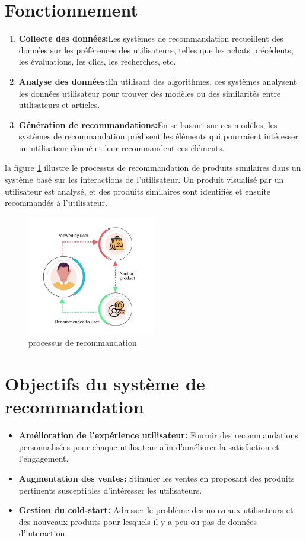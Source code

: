 \documentclass[edit,12pt,a4paper,ChapStyle,oneside,doubleinterligne]{report}
\begin{document}
\section{Fonctionnement}
\begin{enumerate}
    \item \textbf{Collecte des données:}Les systèmes de recommandation recueillent des données sur les préférences des utilisateurs, telles que les achats précédents, les évaluations, les clics, les recherches, etc.
    \item \textbf{Analyse des données:}En utilisant des algorithmes, ces systèmes analysent les données utilisateur pour trouver des modèles ou des similarités entre utilisateurs et articles.
    \item \textbf{Génération de recommandations:}En se basant sur ces modèles, les systèmes de recommandation prédisent les éléments qui pourraient intéresser un utilisateur donné et leur recommandent ces éléments.
\end{enumerate}
la figure \ref{sr} illustre le processus de recommandation de produits similaires dans un système basé sur les interactions de l'utilisateur. Un produit visualisé par un utilisateur est analysé, et des produits similaires sont identifiés et ensuite recommandés à l'utilisateur.
\begin{figure}[H]
    \centering
    \includegraphics[width=0.5\textwidth]{images/recommendation system.jpg}
    \caption{processus de recommandation}\label{sr}
\end{figure}
\section{Objectifs du système de recommandation}
\begin{itemize}
    \item \textbf{Amélioration de l'expérience utilisateur:} Fournir des recommandations personnalisées pour chaque utilisateur afin d'améliorer la satisfaction et l'engagement.
    \item \textbf{Augmentation des ventes:} Stimuler les ventes en proposant des produits pertinents susceptibles d'intéresser les utilisateurs.
    \item \textbf{Gestion du cold-start:} Adresser le problème des nouveaux utilisateurs et des nouveaux produits pour lesquels il y a peu ou pas de données d'interaction.
\end{itemize}
\end{document}
